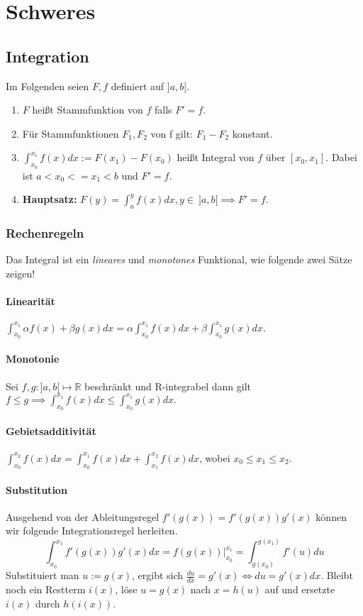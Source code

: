 \documentclass[a4paper, 9pt, DIV=24]{scrartcl}
\begin{document}
\clearpage
\section{Schweres}

\subsection{Integration}
Im Folgenden seien $F, f$ definiert auf $]a,b[$.
\begin{enumerate}[label={(}\arabic*{)}]
 \item $F$ heißt Stammfunktion von $f$ falls $F' = f$.
 \item Für Stammfunktionen $F_1, F_2$ von f gilt: $F_1 - F_2$ konstant.
 \item $\int_{x_0}^{x_1}f(x)dx := F(x_1) - F(x_0)$ heißt Integral von $f$ über $[x_0, x_1]$.
   Dabei ist $a < x_0 <= x_1 < b$ und $F' = f$.
 \item \textbf{Hauptsatz:} $F(y) = \int_{a}^{y}f(x)dx, y \in\ ]a,b[ \implies F' = f.$
\end{enumerate}

\subsubsection{Rechenregeln}
Das Integral ist ein \emph{lineares} und \emph{monotones} Funktional, wie folgende zwei Sätze zeigen!
\paragraph{Linearität}
$\int_{x_0}^{x_1}\alpha f(x) + \beta g(x) dx = \alpha\int_{x_0}^{x_1}f(x)dx + \beta\int_{x_0}^{x_1}g(x)dx.$
\paragraph{Monotonie}
Sei $f,g : ]a,b[ \mapsto \mathbb{R}$ beschränkt und R-integrabel dann gilt
$ f \leq g \implies \int_{x_0}^{x_1}f(x)dx \leq \int_{x_0}^{x_1}g(x)dx. $
\paragraph{Gebietsadditivität}
$\int_{x_0}^{x_2}f(x)dx = \int_{x_0}^{x_1}f(x)dx + \int_{x_1}^{x_2}f(x)dx$, wobei $x_0 \leq x_1 \leq x_2$.

\paragraph{Substitution}
Ausgehend von der Ableitungsregel $f'(g(x)) = f'(g(x))g'(x)$ können wir folgende Integrationsregel herleiten.
\[ \int_{x_0}^{x_1}f'(g(x))g'(x)dx = f(g(x))|_{x_0}^{x_1} = \int_{g(x_0)}^{g(x_1)}f'(u)du \]
Substituiert man $u := g(x)$, ergibt sich $\frac{du}{dx} = g'(x) \iff du = g'(x)dx$.
Bleibt noch ein Restterm $i(x)$, löse $u = g(x)$ nach $x = h(u)$ auf und ersetzte $i(x)$ durch $h(i(x))$.
\end{document}
